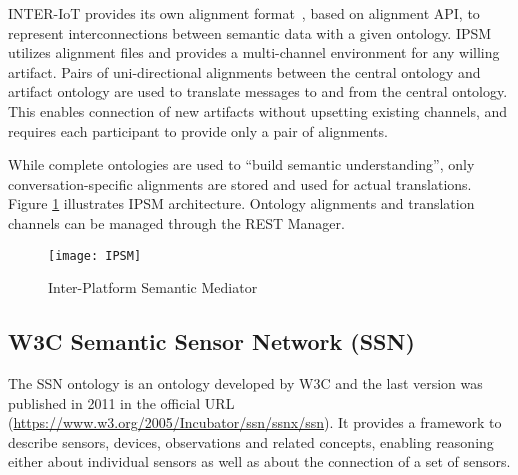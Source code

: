 \documentclass{sig-alternate-05-2015}
\begin{document}
INTER-IoT provides its own alignment format~\cite{Pawlowski2017}, based on alignment API, to represent interconnections between semantic data with a given ontology. IPSM utilizes alignment files and provides a multi-channel environment for any willing artifact. Pairs of uni-directional alignments between the central ontology and artifact ontology are used to translate messages to and from the central ontology. This enables connection of new artifacts without upsetting existing channels, and requires each participant to provide only a pair of alignments.

While complete ontologies are used to “build semantic understanding”, only conversation-specific alignments are stored and used for actual translations. Figure \ref{fig:IPSM} illustrates IPSM architecture. Ontology alignments and translation channels can be managed through the REST Manager.




\begin{figure}[h!]
\centering
\texttt{[image: IPSM]}
\caption{Inter-Platform Semantic Mediator}
\label{fig:IPSM}
\end{figure}


\subsection{W3C Semantic Sensor Network (SSN)}
The SSN ontology \cite{Compton2012} is an ontology developed by W3C and the last version was published in 2011 in the official URL (\url{https://www.w3.org/2005/Incubator/ssn/ssnx/ssn}). It provides a framework to describe sensors, devices, observations and related concepts, enabling reasoning either about individual sensors as well as about the connection of a set of sensors. 
\end{document}

